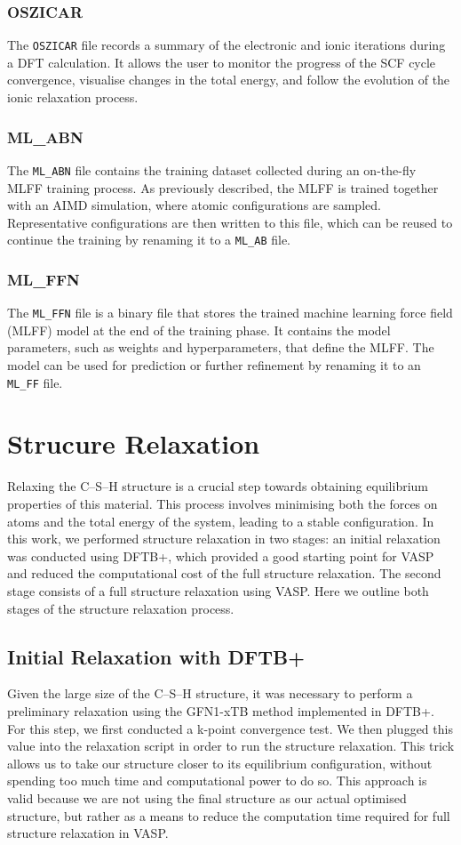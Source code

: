 \subsubsection{OSZICAR}
The \texttt{OSZICAR} file records a summary of the electronic and ionic iterations during a DFT calculation. It allows the user to monitor the progress of the SCF cycle convergence, visualise changes in the total energy, and follow the evolution of the ionic relaxation process. 
\subsubsection{ML\_ABN}
The \texttt{ML\_ABN} file contains the training dataset collected during an on-the-fly MLFF training process. As previously described, the MLFF is trained together with an AIMD simulation, where atomic configurations are sampled. Representative configurations are then written to this file, which can be reused to continue the training by renaming it to a \texttt{ML\_AB} file.

\subsubsection{ML\_FFN}
The \texttt{ML\_FFN} file is a binary file that stores the trained machine learning force field (MLFF) model at the end of the training phase. It contains the model parameters, such as weights and hyperparameters, that define the MLFF. The model can be used for prediction or further refinement by renaming it to an \texttt{ML\_FF} file.


\section{Strucure Relaxation}
\label{sec:structure-relaxation}
Relaxing the  C--S--H structure is a crucial step towards obtaining equilibrium properties of this material. This process involves minimising both the forces on atoms and the total energy of the system, leading to a stable configuration. In this work, we performed structure relaxation in two stages: an initial relaxation was conducted using DFTB+, which provided a good starting point for VASP and reduced the computational cost of the full structure relaxation. The second stage consists of a full structure relaxation using VASP. Here we outline both stages of the structure relaxation process.

\subsection{Initial Relaxation with DFTB+}
Given the large size of the  C--S--H structure, it was necessary to perform a preliminary relaxation using the GFN1-xTB method implemented in DFTB+. For this step, we first conducted a k-point convergence test. We then plugged this value into the relaxation script in order to run the structure relaxation. This trick allows us to take our structure closer to its equilibrium configuration, without spending too much time and computational power to do so. This approach is valid because we are not using the final structure as our actual optimised structure, but rather as a means to reduce the computation time required for full structure relaxation in VASP.  

